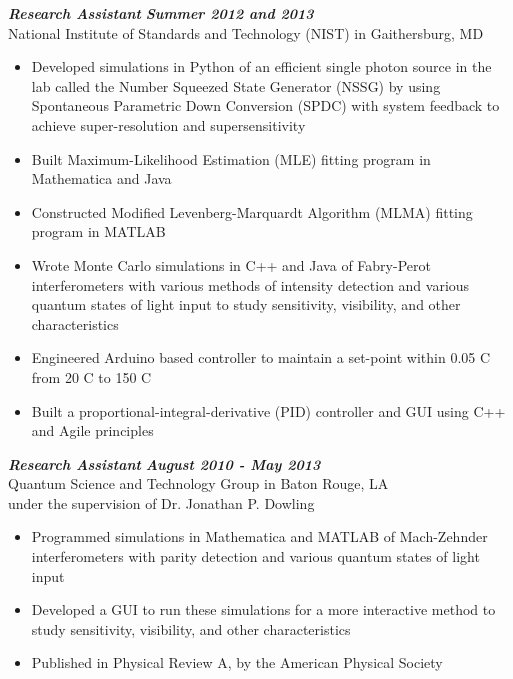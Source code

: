 \documentclass{res}
\begin{document}
\begin{resume}
        {\bfseries {\em Research Assistant}} \hfill {\bfseries{\em Summer 2012 and 2013}} \\
National Institute of Standards and Technology (NIST) in Gaithersburg, MD
                 \begin{itemize}  \itemsep -2pt %
                 \item Developed simulations in Python of an efficient single photon source in the lab called the Number Squeezed State Generator (NSSG) by using Spontaneous Parametric Down Conversion (SPDC) with system feedback to achieve super-resolution and supersensitivity
		\item Built Maximum-Likelihood Estimation (MLE) fitting program in Mathematica and Java
	 	\item Constructed Modified Levenberg-Marquardt Algorithm (MLMA) fitting program in MATLAB
	 	\item Wrote Monte Carlo simulations in C++ and Java of Fabry-Perot interferometers with various methods of intensity detection and various quantum states of light input to study sensitivity, visibility, and other characteristics
		\item Engineered Arduino based controller to maintain a set-point within 0.05 C from 20 C to 150 C
	 	\item Built a proportional-integral-derivative (PID) controller and GUI using C++ and Agile principles
                 \end{itemize}
	{\bfseries {\em  Research Assistant}}  \hfill  {\bfseries{\em August 2010 - May 2013}} \\
		Quantum Science and Technology Group in Baton Rouge, LA \\                 
                 under the supervision of Dr. Jonathan P. Dowling
                 \begin{itemize}  \itemsep -2pt %
		\item Programmed simulations in Mathematica and MATLAB of Mach-Zehnder \\ interferometers with parity detection and various quantum states of light input
		\item Developed a GUI to run these simulations for a more interactive method to study sensitivity, visibility, and other characteristics 
		\item Published in Physical Review A, by the American Physical Society
                 \end{itemize}


\end{resume}
\end{document}

